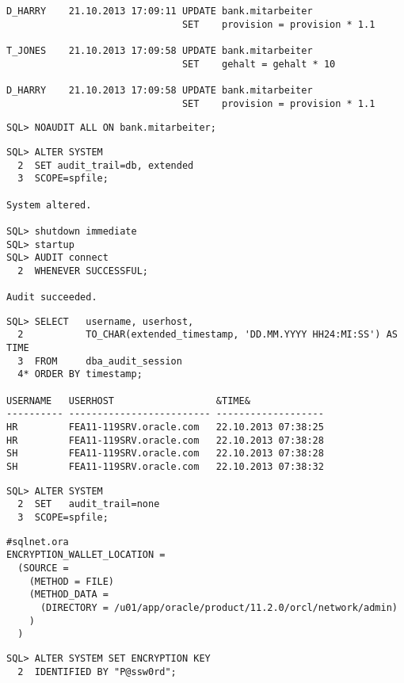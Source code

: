 \begin{enumerate}
\begin{lstlisting}[language=terminal]
D_HARRY    21.10.2013 17:09:11 UPDATE bank.mitarbeiter
                               SET    provision = provision * 1.1

T_JONES    21.10.2013 17:09:58 UPDATE bank.mitarbeiter
                               SET    gehalt = gehalt * 10

D_HARRY    21.10.2013 17:09:58 UPDATE bank.mitarbeiter
                               SET    provision = provision * 1.1
    \end{lstlisting}
    
    \begin{lstlisting}[language=oracle_sql]
SQL> NOAUDIT ALL ON bank.mitarbeiter;
    \end{lstlisting}
    
    \begin{lstlisting}[language=oracle_sql,alsolanguage=sqlplus]
SQL> ALTER SYSTEM
  2  SET audit_trail=db, extended 
  3  SCOPE=spfile;

System altered.

SQL> shutdown immediate
SQL> startup
SQL> AUDIT connect
  2  WHENEVER SUCCESSFUL;

Audit succeeded.
    \end{lstlisting}
    
\clearpage
    
    \begin{lstlisting}[language=oracle_sql]
SQL> SELECT   username, userhost,
  2           TO_CHAR(extended_timestamp, 'DD.MM.YYYY HH24:MI:SS') AS TIME
  3  FROM     dba_audit_session
  4* ORDER BY timestamp;

USERNAME   USERHOST                  &TIME&
---------- ------------------------- -------------------
HR         FEA11-119SRV.oracle.com   22.10.2013 07:38:25
HR         FEA11-119SRV.oracle.com   22.10.2013 07:38:28
SH         FEA11-119SRV.oracle.com   22.10.2013 07:38:28
SH         FEA11-119SRV.oracle.com   22.10.2013 07:38:32
    \end{lstlisting}
    
    \begin{lstlisting}[language=oracle_sql]
SQL> ALTER SYSTEM
  2  SET   audit_trail=none
  3  SCOPE=spfile;
    \end{lstlisting}
    
    \begin{lstlisting}[language=configfile]
#sqlnet.ora
ENCRYPTION_WALLET_LOCATION =
  (SOURCE =
    (METHOD = FILE)
    (METHOD_DATA =
      (DIRECTORY = /u01/app/oracle/product/11.2.0/orcl/network/admin)
    )
  )
    \end{lstlisting}
    \begin{lstlisting}[language=oracle_sql]
SQL> ALTER SYSTEM SET ENCRYPTION KEY
  2  IDENTIFIED BY "P@ssw0rd";


\end{lstlisting}
\end{enumerate}
